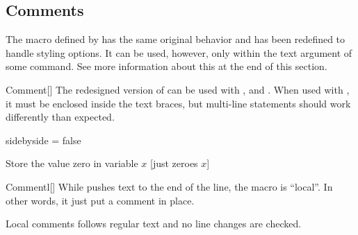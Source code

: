 \documentclass[a4paper, 11pt]{article}
\begin{document}
\subsection{Comments}\label{sec:comments}
The  macro defined by  has the same original behavior and has been redefined to handle styling options. It can be used, however, only within the text argument of some command. See more information about this at the end of this section.

\begin{macro}{Comment}[]
    The redesigned version of  can be used with ,  and . When used with , it must be enclosed inside the text braces, but multi-line statements should work differently than expected.

    \StatementOptions
\end{macro}

\begin{tcblisting}{sidebyside = false}
    \begin{minipage}{6.5cm}
        \begin{algorithmic}
            \State Store the value zero in variable $x$
            [just zeroes $x$]%
        \end{algorithmic}
    \end{minipage}
\end{tcblisting}

\begin{macro}{Commentl}[]
    While  pushes text to the end of the line, the macro  is ``local''. In other words, it just put a comment in place.

    Local comments follows regular text and no line changes are checked.

    \StatementOptions
\end{macro}

\begin{tcblisting}{}
    \begin{algorithmic}
        \EndIf
    \end{algorithmic}
\end{tcblisting}
\end{document}
